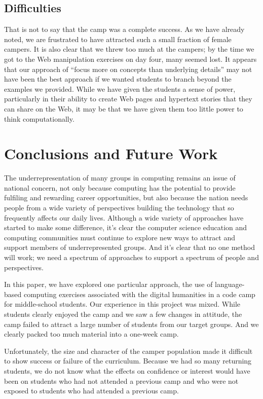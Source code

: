 \subsection{Difficulties}

That is not to say that the camp was a complete success.  As we
have already noted, we are frustrated to have attracted such a small
fraction of female campers.  It is also clear that we threw too
much at the campers; by the time we got to the Web manipulation
exercises on day four, many seemed lost.  It appears that our
approach of ``focus more on concepts than underlying details'' may
not have been the best approach if we wanted students to branch
beyond the examples we provided.  While we have given the students
a sense of power, particularly in their ability to create Web pages
and hypertext stories that they can share on the Web, it may be
that we have given them too little power to think computationally.

\section{Conclusions and Future Work}

The underrepresentation of many groups in computing remains an issue
of national concern, not only because computing has the potential
to provide fulfiling and rewarding career opportunities, but also
because the nation needs people from a wide variety of perspectives
building the technology that so frequently affects our daily lives.
Although a wide variety of approaches have started to make some
difference, it's clear the computer science education and computing
communities must continue to explore new ways to attract and support
members of underrepresented groups.  And it's clear that no one
method will work; we need a spectrum of approaches to support
a spectrum of people and perspectives.

In this paper, we have explored one particular approach, the use
of language-based computing exercises associated with the digital
humanities in a code camp for middle-school students.  Our experience
in this project was mixed.  While students clearly enjoyed the camp
and we saw a few changes in attitude, the camp failed to attract a
large number of students from our target groups.  And we clearly
packed too much material into a one-week camp.

Unfortunately, the size and character of the camper population made
it difficult to show success or failure of the curriculum.  Because
we had so many returning students, we do not know what the effects
on confidence or interest would have been on students who had not
attended a previous camp and who were not exposed to students who
had attended a previous camp.

